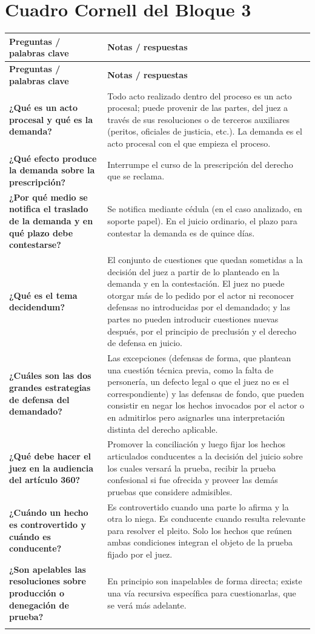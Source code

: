 \documentclass[12pt,oneside]{book}
\newlength{\cqa}
\newlength{\cqb}
\newcommand{\cqheader}{%
  \toprule
  \textbf{Preguntas / palabras clave} & \textbf{Notas / respuestas} \\
  \midrule
}
\newcommand{\cqrow}[2]{%
  \textbf{#1} & #2 \\
  \addlinespace[0.8em]
}
\begin{document}
\clearpage
\section{Cuadro Cornell del Bloque 3}

\begin{longtable}{>{\RaggedRight\arraybackslash}p{\cqa} >{\RaggedRight\arraybackslash}p{\cqb}}
\cqheader
\endfirsthead
\cqheader
\endhead
\cqrow{¿Qué es un acto procesal y qué es la demanda?}{Todo acto realizado dentro del proceso es un acto procesal; puede provenir de las partes, del juez a través de sus resoluciones o de terceros auxiliares (peritos, oficiales de justicia, etc.). La demanda es el acto procesal con el que empieza el proceso.}
\cqrow{¿Qué efecto produce la demanda sobre la prescripción?}{Interrumpe el curso de la prescripción del derecho que se reclama.}
\cqrow{¿Por qué medio se notifica el traslado de la demanda y en qué plazo debe contestarse?}{Se notifica mediante cédula (en el caso analizado, en soporte papel). En el juicio ordinario, el plazo para contestar la demanda es de quince días.}
\cqrow{¿Qué es el tema decidendum?}{El conjunto de cuestiones que quedan sometidas a la decisión del juez a partir de lo planteado en la demanda y en la contestación. El juez no puede otorgar más de lo pedido por el actor ni reconocer defensas no introducidas por el demandado; y las partes no pueden introducir cuestiones nuevas después, por el principio de preclusión y el derecho de defensa en juicio.}
\cqrow{¿Cuáles son las dos grandes estrategias de defensa del demandado?}{Las excepciones (defensas de forma, que plantean una cuestión técnica previa, como la falta de personería, un defecto legal o que el juez no es el correspondiente) y las defensas de fondo, que pueden consistir en negar los hechos invocados por el actor o en admitirlos pero asignarles una interpretación distinta del derecho aplicable.}
\cqrow{¿Qué debe hacer el juez en la audiencia del artículo 360?}{Promover la conciliación y luego fijar los hechos articulados conducentes a la decisión del juicio sobre los cuales versará la prueba, recibir la prueba confesional si fue ofrecida y proveer las demás pruebas que considere admisibles.}
\cqrow{¿Cuándo un hecho es controvertido y cuándo es conducente?}{Es controvertido cuando una parte lo afirma y la otra lo niega. Es conducente cuando resulta relevante para resolver el pleito. Solo los hechos que reúnen ambas condiciones integran el objeto de la prueba fijado por el juez.}
\cqrow{¿Son apelables las resoluciones sobre producción o denegación de prueba?}{En principio son inapelables de forma directa; existe una vía recursiva específica para cuestionarlas, que se verá más adelante.}

\end{longtable}
\end{document}
